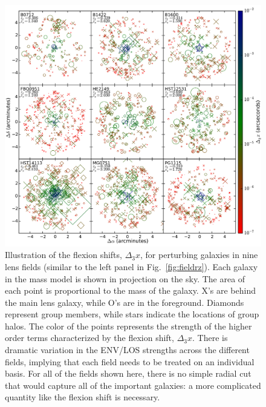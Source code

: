 \documentclass{emulateapj}
\begin{document}
\begin{figure}
\begin{center}
\includegraphics[width=1\textwidth]{allfields.pdf}
\caption{\label{fig:allfields} Illustration of the flexion shifts, $\Delta_3 x$, for perturbing galaxies in nine lens fields (similar to the left panel in Fig.\ \ref{fig:fieldrz}). Each galaxy in the mass model is shown in projection on the sky. The area of each point is proportional to the mass of the galaxy. X's are behind the main lens galaxy, while O's are in the foreground. Diamonds represent group members, while stars indicate the locations of group halos. The color of the points represents the strength of the higher order terms characterized by the flexion shift, $\Delta_3 x$. There is dramatic variation in the ENV/LOS strengths across the different fields, implying that each field needs to be treated on an individual basis. For all of the fields shown here, there is no simple radial cut that would capture all of the important galaxies: a more complicated quantity like the flexion shift is necessary. 
}
\end{center}
\end{figure}
\end{document}
